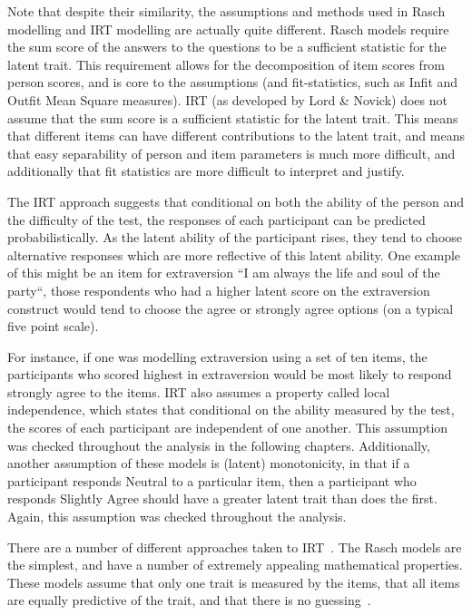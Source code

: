 Note that despite their similarity, the assumptions and methods used in Rasch modelling and IRT modelling are actually quite different. Rasch models require the sum score of the answers to the questions to be a sufficient statistic for the latent trait. This requirement allows for the decomposition of item scores from person scores, and is core to the assumptions (and fit-statistics, such as Infit and Outfit Mean Square measures). IRT (as developed by Lord \& Novick) does not assume that the sum score is a sufficient statistic for the latent trait. This means that different items can have different contributions to the latent trait, and means that easy separability of person and item parameters is much more difficult, and additionally that fit statistics are more difficult to interpret and justify. 

The IRT approach suggests that conditional on both the ability of the person and the difficulty of the test, the responses of each participant can be predicted probabilistically. As the latent ability of the participant rises, they tend to choose alternative responses which are more reflective of this latent ability. One example of this might be an item for extraversion ``I am always the life and soul of the party``, those respondents who had a higher latent score on the extraversion construct would tend to choose the agree or strongly agree options (on a typical five point scale). 

For instance, if one was modelling extraversion using a set of ten items, the participants who scored highest in extraversion would be most likely to respond strongly agree to the items.  IRT also assumes a property called local independence, which states that conditional on the ability measured by the test, the scores of each participant are independent of one another. This assumption was checked throughout the analysis in the following chapters. Additionally, another assumption of these models is (latent) monotonicity, in that if a participant responds Neutral to a particular item, then a participant who responds Slightly Agree should have a greater latent trait than does the first. Again, this assumption was checked throughout the analysis. 

There are a number of different approaches taken to IRT~\cite{van1997handbook,fischer1995rasch}. The  Rasch models are the simplest, and have a number of extremely appealing mathematical properties. These models assume that only one trait is measured by the items, that all items are equally predictive of the trait, and that there is no guessing~\cite{van1997handbook}.

